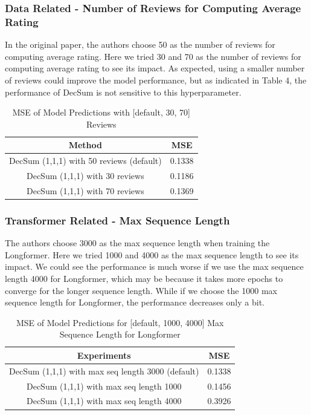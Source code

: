 \documentclass{article}
\begin{document}
\subsubsection{Data Related - Number of Reviews for Computing Average Rating}
In the original paper, the authors choose 50 as the number of reviews for computing average rating. Here we tried 30 and 70 as the number of reviews for computing average rating to see its impact.
As expected, using a smaller number of reviews could improve the model performance, but as indicated in Table 4, the performance of DecSum is not sensitive to this hyperparameter.

\begin{table}[ht]
    \centering
    \caption{MSE of Model Predictions with [default, 30, 70] Reviews}
    \begin{tabular}{|c|c|}
        \hline \textbf{Method} & \textbf{MSE} \\
        \hline DecSum (1,1,1) with 50 reviews (default) & 0.1338 \\
        \hline DecSum (1,1,1) with 30 reviews & 0.1186 \\
        \hline DecSum (1,1,1) with 70 reviews & 0.1369 \\ \hline
    \end{tabular}
\end{table}

\subsubsection{Transformer Related - Max Sequence Length}

The authors choose 3000 as the max sequence length when training the Longformer. Here we tried 1000 and 4000 as the max sequence length to see its impact. We could see the performance is much worse
if we use the max sequence length 4000 for Longformer, which may be because it takes more epochs to converge for the longer sequence length.
While if we choose the 1000 max sequence length for Longformer, the performance decreases only a bit.

\begin{table}[ht]
    \centering
    \caption{MSE of Model Predictions for [default, 1000, 4000] Max Sequence Length for Longformer}
    \begin{tabular}{|c|c|}
        \hline \textbf{Experiments} & \textbf{MSE} \\
        \hline DecSum (1,1,1) with max seq length 3000 (default) & 0.1338 \\
        \hline DecSum (1,1,1) with max seq length 1000 & 0.1456 \\
        \hline DecSum (1,1,1) with max seq length 4000 & 0.3926 \\ \hline
    \end{tabular}
\end{table}
\end{document}
